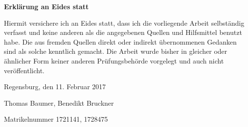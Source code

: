 \documentclass[11pt,a4paper,german,notitlepage]{report}
\newcommand{\authorname}{Thomas Baumer, Benedikt Bruckner}
\newcommand{\matrikelnr}{1721141, 1728475}
\newcommand{\abgabedatum}{11. Februar 2017}
\begin{document}
{}



\clearpage

%
%
%

\thispagestyle{empty}
\label{erklaerung}

\setlength{\parindent}{0em}

\textbf{\large{Erklärung an Eides statt}}

\vspace*{20pt}
Hiermit versichere ich an Eides statt, dass ich die vorliegende Arbeit selbständig verfasst und keine anderen als die angegebenen Quellen und Hilfsmittel benutzt habe. Die aus fremden Quellen direkt oder indirekt übernommenen Gedanken sind als solche kenntlich gemacht. Die Arbeit wurde bisher in gleicher oder ähnlicher Form keiner anderen Prüfungsbehörde vorgelegt und auch nicht veröffentlicht.

\vspace*{65pt}


Regensburg, den \abgabedatum

\vspace*{60pt}


\authorname

Matrikelnummer \matrikelnr
\end{document}

